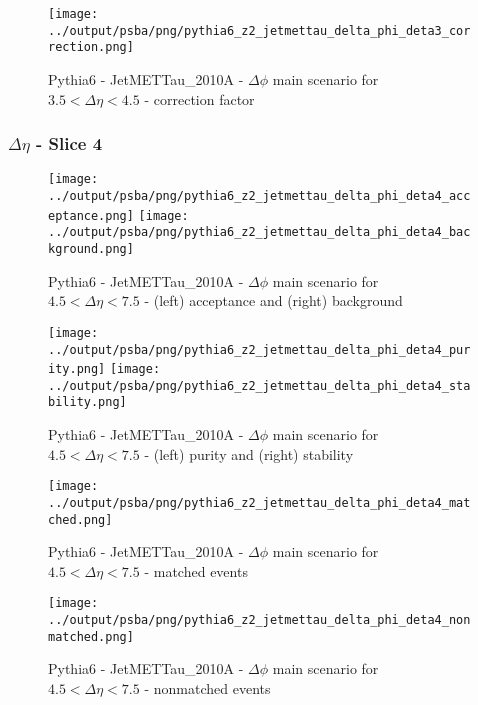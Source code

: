 \documentclass[11pt]{book}
\begin{document}
\begin{figure}[ht]
\centering
\texttt{[image: ../output/psba/png/pythia6\_z2\_jetmettau\_delta\_phi\_deta3\_correction.png]}
\caption{Pythia6 - JetMETTau\_2010A - $\Delta\phi$ main scenario for $3.5 < \Delta\eta < 4.5$ - correction factor}
\label{fig:p6_jetmettau_delta_phi_deta3_correction}
\end{figure}

\clearpage
\subsubsection{$\Delta\eta$ - Slice 4}

\begin{figure}[ht]
\centering
\texttt{[image: ../output/psba/png/pythia6\_z2\_jetmettau\_delta\_phi\_deta4\_acceptance.png]}
\texttt{[image: ../output/psba/png/pythia6\_z2\_jetmettau\_delta\_phi\_deta4\_background.png]}
\caption{Pythia6 - JetMETTau\_2010A - $\Delta\phi$ main scenario for $4.5 < \Delta\eta < 7.5$ - (left) acceptance and (right) background}
\label{fig:p6_jetmettau_delta_phi_deta4_ab}
\end{figure}

\begin{figure}[ht]
\centering
\texttt{[image: ../output/psba/png/pythia6\_z2\_jetmettau\_delta\_phi\_deta4\_purity.png]}
\texttt{[image: ../output/psba/png/pythia6\_z2\_jetmettau\_delta\_phi\_deta4\_stability.png]}
\caption{Pythia6 - JetMETTau\_2010A - $\Delta\phi$ main scenario for $4.5 < \Delta\eta < 7.5$ - (left) purity and (right) stability}
\label{fig:p6_jetmettau_delta_phi_deta4_ps}
\end{figure}

\begin{figure}[ht]
\centering
\texttt{[image: ../output/psba/png/pythia6\_z2\_jetmettau\_delta\_phi\_deta4\_matched.png]}
\caption{Pythia6 - JetMETTau\_2010A - $\Delta\phi$ main scenario for $4.5 < \Delta\eta < 7.5$ - matched events}
\label{fig:p6_jetmettau_delta_phi_deta4_matched}
\end{figure}

\begin{figure}[ht]
\centering
\texttt{[image: ../output/psba/png/pythia6\_z2\_jetmettau\_delta\_phi\_deta4\_nonmatched.png]}
\caption{Pythia6 - JetMETTau\_2010A - $\Delta\phi$ main scenario for $4.5 < \Delta\eta < 7.5$ - nonmatched events}
\label{fig:p6_jetmettau_delta_phi_deta4_nonmatched}
\end{figure}
\end{document}
